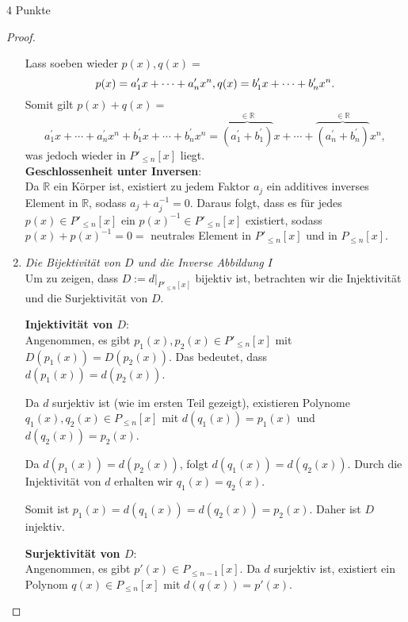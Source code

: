 \documentclass{problemset}
\begin{document}
\begin{problem}{4 Punkte}
\begin{proof}
\begin{enumerate}
              Lass soeben wieder $p(x), q(x) =$ \[
                  p(x) = a^\prime_1 x + \cdots + a^\prime_n x^n, \\
                  q(x) = b^\prime_1 x + \cdots + b^\prime_n x^n.
              \]
              Somit gilt $p(x) + q(x) =$ \[
                  a^\prime_1 x + \cdots + a^\prime_nx^n + b^\prime_1x + \cdots + b^\prime_nx^n =
                  \overbrace{(a^\prime_1+b^\prime_1)}^{\in \mathbb{R}}x + \cdots + \overbrace{(a^\prime_n+b^\prime_n)}^{\in \mathbb{R}}x^n,
              \] was jedoch wieder in $P'_{\le n}[x]$ liegt. \checkmark \\
                 \textbf{Geschlossenheit unter Inversen}: \\ Da $\mathbb{R}$
                 ein Körper ist, existiert zu jedem Faktor $a_j$ ein additives
                 inverses Element in $\mathbb{R}$, sodass $a_j + a_j^{-1} = 0$.
                 Daraus folgt, dass es für jedes $p(x) \in P'_{\le n}[x]$ ein
                 $p(x)^{-1} \in P'_{\le n}[x]$ existiert, sodass $p(x) +
                 p(x)^{-1} = 0 =$ neutrales Element in $P'_{\le n}[x]$ und in
                 $P_{\le n}[x]$. \checkmark
        \item \textit{Die Bijektivität von $D$ und die Inverse Abbildung $I$} \\
              Um zu zeigen, dass $D := d|_{P'_{\le n}[x]}$ bijektiv ist, betrachten wir die Injektivität und die Surjektivität von $D$.

              \textbf{Injektivität von $D$}: \\
              Angenommen, es gibt $p_1(x), p_2(x) \in P'_{\le n}[x]$ mit $D(p_1(x)) = D(p_2(x))$. Das bedeutet, dass $d(p_1(x)) = d(p_2(x))$.

              Da $d$ surjektiv ist (wie im ersten Teil gezeigt), existieren
              Polynome $q_1(x), q_2(x) \in P_{\le n}[x]$ mit $d(q_1(x)) =
              p_1(x)$ und $d(q_2(x)) = p_2(x)$.

              Da $d(p_1(x)) = d(p_2(x))$, folgt $d(q_1(x)) = d(q_2(x))$. Durch
              die Injektivität von $d$ erhalten wir $q_1(x) = q_2(x)$.

              Somit ist $p_1(x) = d(q_1(x)) = d(q_2(x)) = p_2(x)$. Daher ist
              $D$ injektiv. \checkmark

              \textbf{Surjektivität von $D$}: \\
              Angenommen, es gibt $p'(x) \in P_{\le n-1}[x]$. Da $d$ surjektiv ist, existiert ein Polynom $q(x) \in P_{\le n}[x]$ mit $d(q(x)) = p'(x)$.


\end{enumerate}
\end{proof}
\end{problem}
\end{document}
